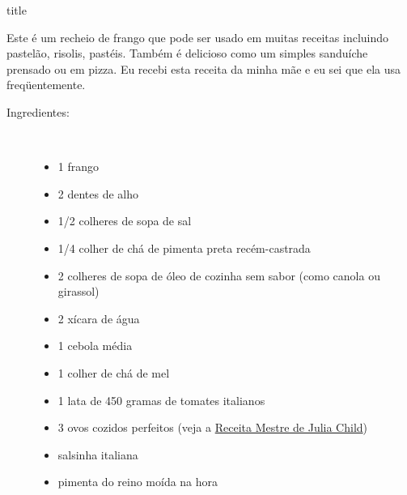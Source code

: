\documentclass [11pt, letterpaper] {article}
\begin{document}
 {title}


Este \'e um recheio de frango que pode ser usado em muitas receitas incluindo pastel\~ao, risolis, past\'eis. Tamb\'em \'e delicioso como um simples sandu\'iche prensado ou em pizza. Eu recebi esta receita da minha m\~ae e eu sei que ela usa freq\"uentemente.

\begin {description}

\item [Ingredientes:] \ \\
\begin {itemize}
\item 1 frango
\item 2 dentes de alho
\item 1/2 colheres de sopa de sal
\item 1/4 colher de chá de pimenta preta recém-castrada
        \item 2 colheres de sopa de óleo de cozinha sem sabor (como canola ou girassol)
        \item 2 xícara de água
        \item 1 cebola média
        \item 1 colher de chá de mel
\item 1 lata de 450 gramas de tomates italianos
\item 3 ovos cozidos perfeitos (veja a \href{HardBoiledEggs.html}{Receita Mestre de Julia Child})
        \item salsinha italiana
        \item pimenta do reino mo\'ida na hora
\end {itemize}



\end{description}
\end{document}

